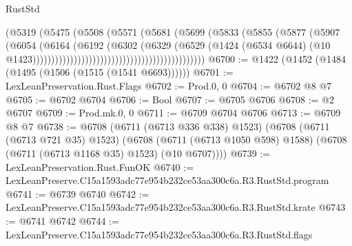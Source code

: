 \begin{lexlean}{RustStd}
\begin{coremodule}
                                                            (@5319
                                                              (@5475
                                                                (@5508
                                                                  (@5571
                                                                    (@5681
                                                                      (@5699
                                                                        (@5833
                                                                          (@5855
                                                                            (@5877
                                                                              (@5907
                                                                                (@6054
                                                                                  (@6164
                                                                                    (@6192
                                                                                      (@6302
                                                                                        (@6329
                                                                                          (@6529
                                                                                            (@1424
                                                                                              (@6534
                                                                                                @6644)
                                                                                              (@10
                                                                                                @1423))))))))))))))))))))))))))))))))))))))))))))))
@6700 := @1422 (@1452 (@1484 (@1495 (@1506 (@1515 (@1541 @6693))))))
@6701 := LexLeanPreservation.Rust.Flags
@6702 := Prod.{0, 0}
@6704 := @6702 @8 @7
@6705 := @6702 @6704
@6706 := Bool
@6707 := @6705 @6706
@6708 := @2 @6707
@6709 := Prod.mk.{0, 0}
@6711 := @6709 @6704 @6706
@6713 := @6709 @8 @7
@6738 := @6708
    (@6711 (@6713 @336 @338) @1523)
    (@6708
      (@6711 (@6713 @721 @35) @1523)
      (@6708 (@6711 (@6713 @1050 @598) @1588) (@6708 (@6711 (@6713 @1168 @35) @1523) (@10 @6707))))
@6739 := LexLeanPreservation.Rust.FunOK
@6740 := LexLeanPreserve.C15a1593adc77e954b232ce53aa300c6a.R3.RustStd.program
@6741 := @6739 @6740
@6742 := LexLeanPreserve.C15a1593adc77e954b232ce53aa300c6a.R3.RustStd.krate
@6743 := @6741 @6742
@6744 := LexLeanPreserve.C15a1593adc77e954b232ce53aa300c6a.R3.RustStd.flags

\end{coremodule}
\end{lexlean}
